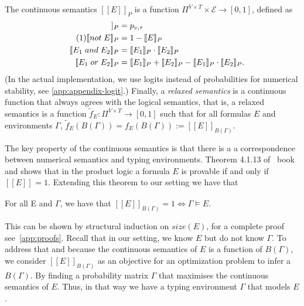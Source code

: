 \documentclass[acmsmall, review, anonymous]{acmart}\settopmatter{printfolios=true,printccs=false,printacmref=false}
\newcommand{\qqpi}[2]{[\![#2]\!]_{#1}}
\newcommand\numberthis{\addtocounter{equation}{1}\tag{\theequation}}
\newcommand{\margincomment}[2]{\marginpar{\scriptsize\color{Maroon}#1 says: #2}}
\newcommand{\ivp}[1]{\margincomment{IVP}{#1}}
\begin{document}
The continuous semantics $\qqpi{P}{E}$ is a function $\Pi^{V \times T} \times \mathcal{E} \rightarrow [0, 1]$,
defined as
\begin{align*}
	\qqpi{P}{x_v \mathrel{is} l_\tau} & = p_{v,\tau}                        \\  \numberthis \label{eq:logical}
	\qqpi{P}{\mathrel{not} E}         & = 1-\qqpi{P}{E}                     \\
	\qqpi{P}{E_1 \mathrel{and} E_2}   & = \qqpi{P}{E_1} \cdot \qqpi{P}{E_2} \\
	\qqpi{P}{E_1 \mathrel{or} E_2}    & =
	\qqpi{P}{E_1} + \qqpi{P}{E_2} - \qqpi{P}{E_1}\cdot\qqpi{P}{E_2}.
\end{align*}
(In the actual implementation, we use logits instead of probabilities
for numerical stability, see \cref{app:appendix-logit}.)
Finally, a \emph{relaxed semantics} is a continuous function
that always agrees with the logical semantics, that is,
a relaxed semantics is a function
$\tilde{f}_{E} : \Pi^{V \times T}  \rightarrow [0, 1]$
such that for all formulas $E$ and environments $\Gamma$,
$\tilde{f}_{E}(B(\Gamma)) = f_E(B(\Gamma)) := \qqpi{B(\Gamma)}{E}$.

The key property of the continuous semantics is that there is a 
a correspondence between numerical semantics and typing environments.
Theorem 4.1.13 of~\citet{hajek98} book and shows that in the product logic a formula $E$ is provable if and only if  $\qqpi{}{E} = 1$. Extending this theorem to our setting we have that 
\begin{theorem}\label{eq:soft2hard}
For all E and $\Gamma$, we have that $\qqpi{B(\Gamma)}{E} = 1 \Leftrightarrow \Gamma \models E.$     
\end{theorem}
This can be shown by structural induction
on $size(E)$, for a complete proof see~\cref{app:proofs}. Recall that in our setting, we know $E$ but
do not know $\Gamma$. To address that 
and because the continuous semantics of $E$ is a function of $B(\Gamma)$, we consider $\qqpi{B(\Gamma)}{E}$ as an objective for an optimization problem to infer a $B(\Gamma)$. By finding a probability matrix $\Gamma$ that maximises the continuous semantics of $E$. Thus, in that way we have a typing environment $\Gamma$ that models $E$. 
\end{document}
